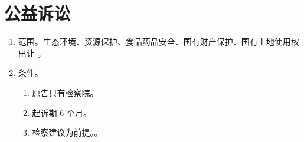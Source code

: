 \section{公益诉讼}
\begin{enumerate}
  \item 范围。生态环境、资源保护、食品药品安全、国有财产保护、国有土地使用权出让 \yjt {}。
  \item 条件。
        \begin{enumerate}
          \item 原告只有检察院。
          \item 起诉期 6 个月。
          \item 检察建议为前提。。
        \end{enumerate}
\end{enumerate}
